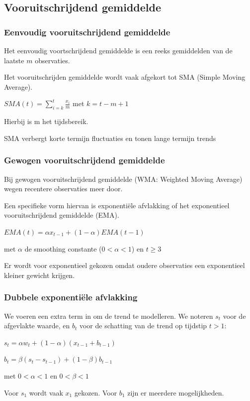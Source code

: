 \documentclass[a4paper,12pt]{article}
\begin{document}
\subsection{Vooruitschrijdend gemiddelde}
\subsubsection{Eenvoudig vooruitschrijdend gemiddelde}
Het eenvoudig voortschrijdend gemiddelde is een reeks gemiddelden van de laatste $m$ observaties.

Het vooruitschrijden gemiddelde wordt vaak afgekort tot SMA (Simple Moving Average).

$SMA(t) = \sum^t_{i=k}\frac{x_i}{m}$ met $k = t-m+1$

Hierbij is m het tijdsbereik.

SMA verbergt korte termijn fluctuaties en tonen lange termijn trends

\subsubsection{Gewogen vooruitschrijdend gemiddelde}
Bij gewogen vooruitschrijdend gemiddelde (WMA: Weighted Moving Average) wegen recentere observaties meer door.

Een specifieke vorm hiervan is exponentiële afvlakking of het exponentieel vooruitschrijdend gemiddelde (EMA).

$EMA(t) = \alpha x_{t-1} + (1-\alpha ) EMA(t-1)$

met $\alpha$ de smoothing constante ($0<\alpha < 1$) en $t\geq 3$

Er wordt voor exponentieel gekozen omdat oudere observaties een exponentieel kleiner gewicht krijgen.

\subsubsection{Dubbele exponentiële afvlakking}
We voeren een extra term in om de trend te modelleren.
We noteren $s_t$ voor de afgevlakte waarde, en $b_t$ voor de schatting van de trend op tijdstip $t > 1$:

$s_t = \alpha w_t + (1-\alpha ) (x_{t-1}+b_{t-1})$

$b_t = \beta (s_t - s_{t-1})+(1-\beta )b_{t-1}$

met $0 < \alpha < 1$ en $0 < \beta < 1$

Voor $s_1$ wordt vaak $x_1$ gekozen.
Voor $b_1$ zijn er meerdere mogelijkheden.
\end{document}
